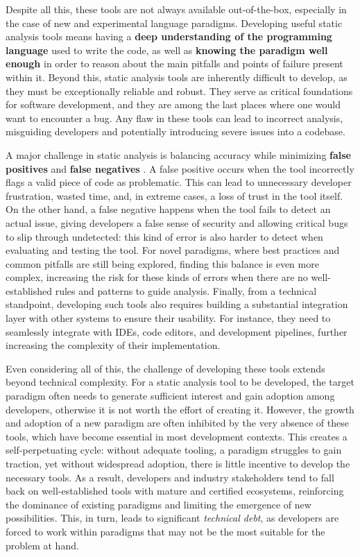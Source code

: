 \documentclass[12pt,a4paper,openright,twoside]{book}
\begin{document}
Despite all this, these tools are not always available out-of-the-box,
especially in the case of new and experimental language paradigms. Developing
useful static analysis tools means having a \textbf{deep understanding of the
programming language} used to write the code, as well as \textbf{knowing the
paradigm well enough} in order to reason about the main pitfalls and points of
failure present within it.
%
Beyond this, static analysis tools are inherently difficult to develop, as they
must be exceptionally reliable and robust. They serve as critical foundations
for software development, and they are among the last places where one would
want to encounter a bug. Any flaw in these tools can lead to incorrect analysis,
misguiding developers and potentially introducing severe issues into a codebase.

A major challenge in static analysis is balancing accuracy while minimizing
\textbf{false positives} and \textbf{false negatives}
\cite{DBLP:journals/queue/Thomson21}. A false positive occurs when the tool
incorrectly flags a valid piece of code as problematic. This can lead to
unnecessary developer frustration, wasted time, and, in extreme cases, a loss of
trust in the tool itself. On the other hand, a false negative happens when the
tool fails to detect an actual issue, giving developers a false sense of
security and allowing critical bugs to slip through undetected: this kind of
error is also harder to detect when evaluating and testing the tool.
%
For novel paradigms, where best practices and common pitfalls are still being
explored, finding this balance is even more complex, increasing the risk for
these kinds of errors when there are no well-established rules and patterns to
guide analysis.
%
Finally, from a technical standpoint, developing such tools also requires
building a substantial integration layer with other systems to ensure their
usability. For instance, they need to seamlessly integrate with \acp{IDE}, code
editors, and development pipelines, further increasing the complexity of their
implementation.

Even considering all of this, the challenge of developing these tools extends
beyond technical complexity. For a static analysis tool to be developed, the
target paradigm often needs to generate sufficient interest and gain adoption
among developers, otherwise it is not worth the effort of creating it. However,
the growth and adoption of a new paradigm are often inhibited by the very
absence of these tools, which have become essential in most development
contexts. This creates a self-perpetuating cycle: without adequate tooling, a
paradigm struggles to gain traction, yet without widespread adoption, there is
little incentive to develop the necessary tools.
%
As a result, developers and industry stakeholders tend to fall back on
well-established tools with mature and certified ecosystems, reinforcing the
dominance of existing paradigms and limiting the emergence of new possibilities.
This, in turn, leads to significant \emph{technical debt}, as developers are
forced to work within paradigms that may not be the most suitable for the
problem at hand. 
\end{document}
